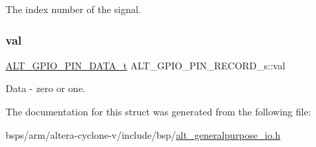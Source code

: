 The index number of the signal. \mbox{\label{structALT__GPIO__PIN__RECORD__s_ab2a16995759994ff9b5c25de0af55627}} 
\subsubsection{\texorpdfstring{val}{val}}
{\footnotesize\ttfamily \mbox{\hyperlink{group__ALT__GPIO__API__CONFIG_ga757cd8797c8bb2ed86d75d961ce9041b}{A\+L\+T\+\_\+\+G\+P\+I\+O\+\_\+\+P\+I\+N\+\_\+\+D\+A\+T\+A\+\_\+t}} A\+L\+T\+\_\+\+G\+P\+I\+O\+\_\+\+P\+I\+N\+\_\+\+R\+E\+C\+O\+R\+D\+\_\+s\+::val}

Data -\/ zero or one. 

The documentation for this struct was generated from the following file\+:\begin{DoxyCompactItemize}
\item 
bsps/arm/altera-\/cyclone-\/v/include/bsp/\mbox{\hyperlink{alt__generalpurpose__io_8h}{alt\+\_\+generalpurpose\+\_\+io.\+h}}\end{DoxyCompactItemize}

